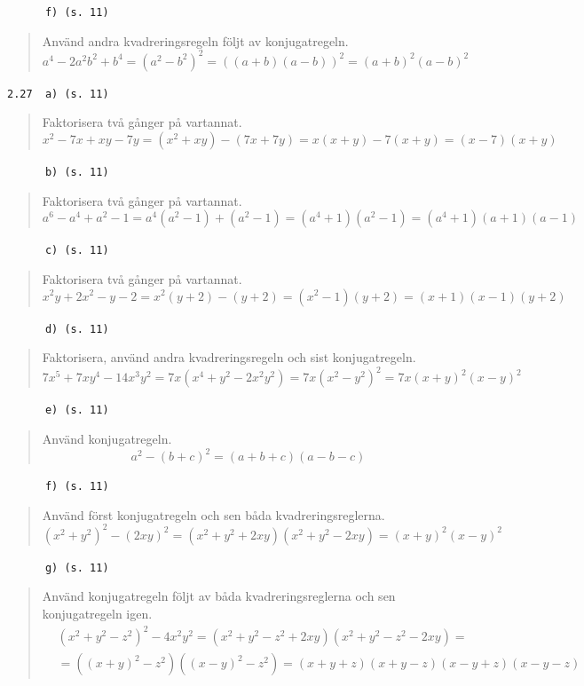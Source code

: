 \documentclass[a4paper]{article}
\newcommand{\tskcol}[1]{\textcolor{tskcol}{#1}}
\begin{document}
	\texttt{\tskcol{~~~~~~f) (s. 11)}}
	\begin{quotation}
		\noindent
		Använd andra kvadreringsregeln följt av konjugatregeln.
		\[a^4-2a^2b^2+b^4=(a^2-b^2)^2=((a+b)(a-b))^2=(a+b)^2(a-b)^2\]
	\end{quotation}
	
	\texttt{\tskcol{2.27~~a) (s. 11)}}
	\begin{quotation}
		\noindent
		Faktorisera två gånger på vartannat.
		\[x^2-7x+xy-7y=(x^2+xy)-(7x+7y)=x(x+y)-7(x+y)=(x-7)(x+y)\]
	\end{quotation}
	
	\texttt{\tskcol{~~~~~~b) (s. 11)}}
	\begin{quotation}
		\noindent
		Faktorisera två gånger på vartannat.
		\[a^6-a^4+a^2-1=a^4(a^2-1)+(a^2-1)=(a^4+1)(a^2-1)=(a^4+1)(a+1)(a-1)\]
	\end{quotation}
	
	\texttt{\tskcol{~~~~~~c) (s. 11)}}
	\begin{quotation}
		\noindent
		Faktorisera två gånger på vartannat.
		\[x^2y+2x^2-y-2=x^2(y+2)-(y+2)=(x^2-1)(y+2)=(x+1)(x-1)(y+2)\]
	\end{quotation}
	
	\texttt{\tskcol{~~~~~~d) (s. 11)}}
	\begin{quotation}
		\noindent
		Faktorisera, använd andra kvadreringsregeln och sist konjugatregeln.
		\[7x^5+7xy^4-14x^3y^2=7x(x^4+y^2-2x^2y^2)=7x(x^2-y^2)^2=7x(x+y)^2(x-y)^2\]
	\end{quotation}
	
	\texttt{\tskcol{~~~~~~e) (s. 11)}}
	\begin{quotation}
		\noindent
		Använd konjugatregeln.
		\[a^2-(b+c)^2=(a+b+c)(a-b-c)\]
	\end{quotation}
	
	\pagebreak
	\texttt{\tskcol{~~~~~~f) (s. 11)}}
	\begin{quotation}
		\noindent
		Använd först konjugatregeln och sen båda kvadreringsreglerna.
		\[(x^2+y^2)^2-(2xy)^2=(x^2+y^2+2xy)(x^2+y^2-2xy)=(x+y)^2(x-y)^2\]
	\end{quotation}
	
	\texttt{\tskcol{~~~~~~g) (s. 11)}}
	\begin{quotation}
		\noindent
		Använd konjugatregeln följt av båda kvadreringsreglerna och sen konjugatregeln igen.
		\begin{align*}
			&(x^2+y^2-z^2)^2-4x^2y^2=
			(x^2+y^2-z^2+2xy)(x^2+y^2-z^2-2xy)= \\
			&=((x+y)^2-z^2)((x-y)^2-z^2)=
			(x+y+z)(x+y-z)(x-y+z)(x-y-z)
		\end{align*}
	\end{quotation}
	
\end{document}
